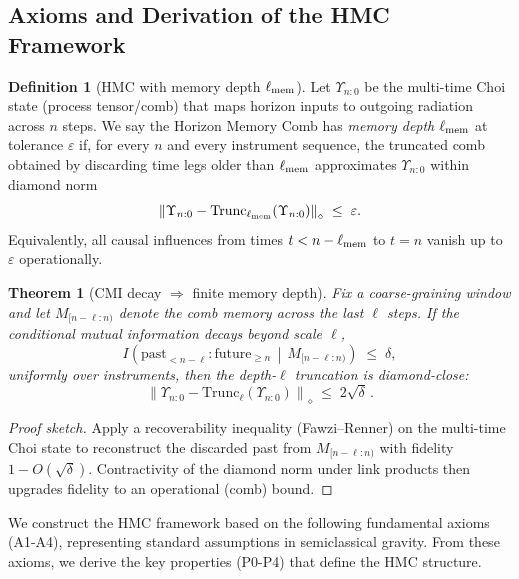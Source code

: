 \documentclass[a4paper,11pt]{article}
\newcommand{\Ddiamond}[1]{\left\|#1\right\|_\diamond}
\newcommand{\HMC}{\textsc{HMC}\xspace}
\theoremstyle{plain}
\newtheorem{theorem}{Theorem}
\theoremstyle{definition}
\newtheorem{definition}{Definition}
\theoremstyle{remark}
\begin{document}
\subsection{Axioms and Derivation of the \HMC{} Framework}
\label{sec:assumptions}

\begin{definition}[\HMC{} with memory depth $\ell_{\rm mem}$]\label{def:\HMC{}-memory-depth}
Let $\Upsilon_{n{:}0}$ be the multi-time Choi state (process tensor/comb) that maps horizon inputs to outgoing radiation across $n$ steps.
We say the Horizon Memory Comb has \emph{memory depth} $\ell_{\rm mem}$ at tolerance $\varepsilon$ if, for every $n$ and every instrument sequence, the truncated comb
obtained by discarding time legs older than $\ell_{\rm mem}$ approximates $\Upsilon_{n{:}0}$ within diamond norm
\[
  \Ddiamond{\Upsilon_{n{:}0}-\mathrm{Trunc}_{\ell_{\rm mem}}(\Upsilon_{n{:}0})}\;\le\;\varepsilon.
\]
Equivalently, all causal influences from times $t<n-\ell_{\rm mem}$ to $t=n$ vanish up to $\varepsilon$ operationally.
\end{definition}

\begin{theorem}[CMI decay $\Rightarrow$ finite memory depth]\label{thm:cmi-to-depth}
Fix a coarse-graining window and let $M_{[n-\ell{:}n)}$ denote the comb memory across the last $\ell$ steps.
If the conditional mutual information decays beyond scale $\ell$,
\[
I\!\left( \text{past}_{<n-\ell} : \text{future}_{\ge n} \,\middle|\, M_{[n-\ell{:}n)} \right)\;\le\;\delta,
\]
uniformly over instruments, then the depth-$\ell$ truncation is diamond-close:
\[
\Ddiamond{\Upsilon_{n{:}0}-\mathrm{Trunc}_{\ell}(\Upsilon_{n{:}0})}\;\le\;2\sqrt{\delta}\,.
\]
\end{theorem}
\begin{proof}[Proof sketch]
Apply a recoverability inequality (Fawzi--Renner) on the multi-time Choi state to reconstruct the discarded past from $M_{[n-\ell{:}n)}$ with fidelity $1-O(\sqrt{\delta})$.
Contractivity of the diamond norm under link products then upgrades fidelity to an operational (comb) bound.
\end{proof}

We construct the \HMC{} framework based on the following fundamental axioms (A1-A4), representing standard assumptions in semiclassical gravity. From these axioms, we derive the key properties (P0-P4) that define the \HMC{} structure.
\end{document}
